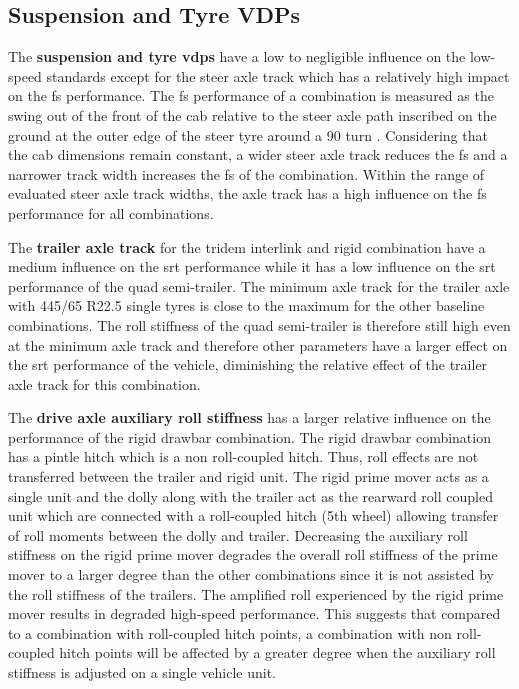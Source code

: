 
\subsection{Suspension and Tyre VDPs}\label{section:disc-relative-influence-suspension-tyre}

The \textbf{suspension and tyre \glspl{vdp}} have a low to negligible influence on the low-speed standards except for the steer axle track which has a relatively high impact on the \gls{fs} performance. The \gls{fs} performance of a combination is measured as the swing out of the front of the cab relative to the steer axle path inscribed on the ground at the outer edge of the steer tyre around a 90\degree{} turn \cite{NationalTransportCommission2008}. Considering that the cab dimensions remain constant, a wider steer axle track reduces the \gls{fs} and a narrower track width increases the \gls{fs} of the combination. Within the range of evaluated steer axle track widths, the axle track has a high influence on the \gls{fs} performance for all combinations.

The \textbf{trailer axle track} for the tridem interlink and rigid combination have a medium influence on the \gls{srt} performance while it has a low influence on the \gls{srt} performance of the quad semi-trailer. The minimum axle track for the trailer axle with 445/65 R22.5 single tyres is close to the maximum for the other baseline combinations. The roll stiffness of the quad semi-trailer is therefore still high even at the minimum axle track and therefore other parameters have a larger effect on the \gls{srt} performance of the vehicle, diminishing the relative effect of the trailer axle track for this combination.

The \textbf{drive axle auxiliary roll stiffness} has a larger relative influence on the performance of the rigid drawbar combination. The rigid drawbar combination has a pintle hitch which is a non roll-coupled hitch. Thus, roll effects are not transferred between the trailer and rigid unit. The rigid prime mover acts as a single unit and the dolly along with the trailer act as the rearward roll coupled unit which are connected with a roll-coupled hitch (5th wheel) allowing transfer of roll moments between the dolly and trailer. Decreasing the auxiliary roll stiffness on the rigid prime mover degrades the overall roll stiffness of the prime mover to a larger degree than the other combinations since it is not assisted by the roll stiffness of the trailers. The amplified roll experienced by the rigid prime mover results in degraded high-speed performance. This suggests that compared to a combination with roll-coupled hitch points, a combination with non roll-coupled hitch points will be affected by a greater degree when the auxiliary roll stiffness is adjusted on a single vehicle unit.

